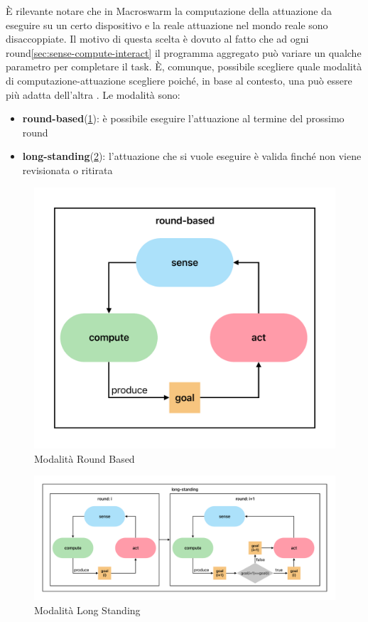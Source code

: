 \documentclass[12pt,a4paper,openright,twoside]{book}
\begin{document}
È rilevante notare che in Macroswarm la computazione della attuazione da eseguire su un certo dispositivo e la reale attuazione nel mondo reale sono disaccoppiate. Il motivo di questa scelta è dovuto al fatto che ad ogni round\cref{sec:sense-compute-interact} il programma aggregato può variare un qualche parametro per completare il task. È, comunque, possibile scegliere quale modalità di computazione-attuazione scegliere poiché, in base al contesto, una può essere più adatta dell'altra \cite{Macroswarm}. Le modalità sono:

\begin{itemize}
    \item \textbf{round-based}(\cref{fig:round-based}): è possibile eseguire l'attuazione al termine del prossimo round 
    \item \textbf{long-standing}(\cref{fig:long-standong}): l'attuazione che si vuole eseguire è valida finché non viene revisionata o ritirata
\end{itemize}

\begin{figure}
    \centering
    \includegraphics[width=.6\linewidth]{figures/round-based.pdf}
    \caption{Modalità Round Based}
    \label{fig:round-based}
\end{figure}

\begin{figure}
    \centering
    \includegraphics[width=.99\linewidth]{figures/long-standing.pdf}
    \caption{Modalità Long Standing}
    \label{fig:long-standong}
\end{figure}
\end{document}

